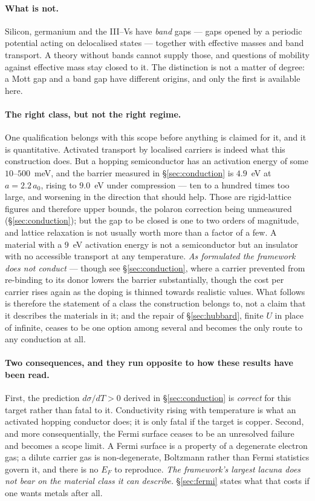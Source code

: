 \documentclass[11pt]{article}
\begin{document}
\paragraph{What is not.} Silicon, germanium and the III--Vs have \emph{band} gaps --- gaps opened by
a periodic potential acting on delocalised states --- together with effective masses and band
transport. A theory without bands cannot supply those, and questions of mobility against effective
mass stay closed to it. The distinction is not a matter of degree: a Mott gap and a band gap have
different origins, and only the first is available here.

\paragraph{The right class, but not the right regime.} One qualification belongs with this scope
before anything is claimed for it, and it is quantitative. Activated transport by localised carriers
is indeed what this construction does. But a hopping semiconductor has an activation energy of some
$10$--$500$~meV, and the barrier measured in \S\ref{sec:conduction} is $4.9$~eV at $a=2.2\,a_0$,
rising to $9.0$~eV under compression --- ten to a hundred times too large, and worsening in the
direction that should help. Those are rigid-lattice figures and therefore upper bounds, the polaron
correction being unmeasured (\S\ref{sec:conduction}); but the gap to be closed is one to two orders
of magnitude, and lattice relaxation is not usually worth more than a factor of a few. A material with a $9$~eV activation energy is not a semiconductor but an
insulator with no accessible transport at any temperature. \emph{As formulated the framework does not conduct} --- though see
\S\ref{sec:conduction}, where a carrier prevented from re-binding to its donor lowers the
barrier substantially, though the cost per carrier rises again as the doping is thinned towards
realistic values. What follows is therefore the
statement of a class the construction belongs to, not a claim that it describes the materials in it;
and the repair of \S\ref{sec:hubbard}, finite $U$ in place of infinite, ceases to be one option among
several and becomes the only route to any conduction at all.

\paragraph{Two consequences, and they run opposite to how these results have been read.} First, the
prediction $d\sigma/dT>0$ derived in \S\ref{sec:conduction} is \emph{correct} for this target rather
than fatal to it. Conductivity rising with temperature is what an activated hopping conductor does;
it is only fatal if the target is copper. Second, and more consequentially, the Fermi surface ceases
to be an unresolved failure and becomes a scope limit. A Fermi surface is a property of a degenerate
electron gas; a dilute carrier gas is non-degenerate, Boltzmann rather than Fermi statistics govern
it, and there is no $E_F$ to reproduce. \emph{The framework's largest lacuna does not bear on the
material class it can describe.} \S\ref{sec:fermi} states what that costs if one wants metals after
all.
\end{document}
